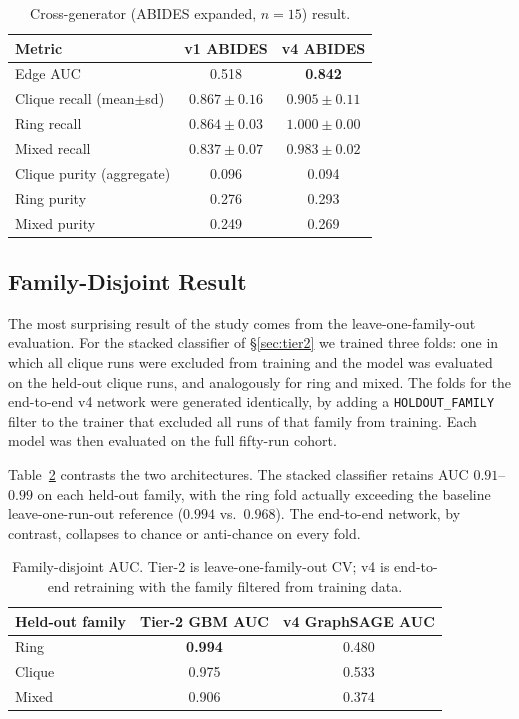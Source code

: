 \documentclass[10pt,twocolumn,letterpaper]{article}
\begin{document}
\begin{table}[t]
\caption{Cross-generator (ABIDES expanded, $n=15$) result.}
\label{tab:abides}
\centering
\begin{tabular}{lcc}
\toprule
Metric & v1 ABIDES & v4 ABIDES \\
\midrule
Edge AUC & 0.518 & \textbf{0.842} \\
Clique recall (mean$\pm$sd) & $0.867\pm0.16$ & $\mathbf{0.905\pm0.11}$ \\
Ring recall & $0.864\pm0.03$ & $\mathbf{1.000\pm0.00}$ \\
Mixed recall & $0.837\pm0.07$ & $\mathbf{0.983\pm0.02}$ \\
Clique purity (aggregate) & 0.096 & 0.094 \\
Ring purity & 0.276 & 0.293 \\
Mixed purity & 0.249 & 0.269 \\
\bottomrule
\end{tabular}
\end{table}

\subsection{Family-Disjoint Result}
\label{sec:family}
The most surprising result of the study comes from the
leave-one-family-out evaluation. For the stacked classifier of
\S\ref{sec:tier2} we trained three folds: one in which all clique runs
were excluded from training and the model was evaluated on the held-out
clique runs, and analogously for ring and mixed. The folds for the
end-to-end v4 network were generated identically, by adding a
\texttt{HOLDOUT\_FAMILY} filter to the trainer that excluded all runs of
that family from training. Each model was then evaluated on the full
fifty-run cohort.

Table~\ref{tab:family} contrasts the two architectures. The stacked
classifier retains AUC \(0.91\)--\(0.99\) on each held-out family,
with the ring fold actually exceeding the baseline leave-one-run-out
reference (\(0.994\) vs.\ \(0.968\)). The end-to-end network, by
contrast, collapses to chance or anti-chance on every fold.

\begin{table}[t]
\caption{Family-disjoint AUC. Tier-2 is leave-one-family-out CV; v4 is end-to-end retraining with the family filtered from training data.}
\label{tab:family}
\centering
\begin{tabular}{lcc}
\toprule
Held-out family & Tier-2 GBM AUC & v4 GraphSAGE AUC \\
\midrule
Ring & \textbf{0.994} & 0.480 \\
Clique & 0.975 & 0.533 \\
Mixed & 0.906 & 0.374 \\
\bottomrule
\end{tabular}
\end{table}
\end{document}
